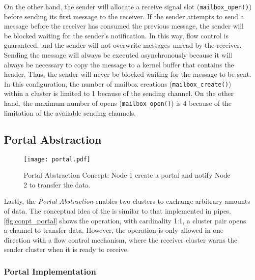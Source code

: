 				On the other hand, the sender will allocate a receive signal slot (\texttt{mailbox\_open()})
				before sending its first message to the receiver.
				If the sender attempts to send a message before the receiver has consumed
				the previous message, the sender will be blocked waiting for the sender's notification.
				In this way, flow control is guaranteed, and the sender will not overwrite
				messages unread by the receiver.
				Sending the message will always be executed asynchronously
				because it will always be necessary to copy the message to
				a kernel buffer that contains the header.
				Thus, the sender will never be blocked waiting for the message to be sent.
				In this configuration, the number of mailbox creations (\texttt{mailbox\_create()})
				within a cluster is limited to 1 because of the \cnoc sending channel.
				On the other hand, the maximum number of opens (\texttt{mailbox\_open()}) is
				4 because of the limitation of the available \dnoc sending channels.

		\subsection{Portal Abstraction}
		\label{sec.portal-abs}

			\begin{figure}[!tb]
				\centering%
				\caption{Portal Abstraction Concept: Node 1 create a portal and notify Node 2 to transfer the data.}%
				\label{fig:conpt_portal}%
				\texttt{[image: portal.pdf]}%
			\end{figure}


			Lastly, the \textit{Portal Abstraction} enables two clusters to exchange arbitrary
			amounts of data.
			The conceptual idea of the \portal is similar to that implemented in \posix pipes.
			\autoref{fig:conpt_portal} shows the \portal operation, with cardinality
			1:1, a cluster pair opens a channel to transfer data.
			However, the operation is only allowed in one direction with a flow control mechanism,
			where the receiver cluster warns the sender cluster when it is ready to receive.

			\subsubsection*{Portal Implementation}

